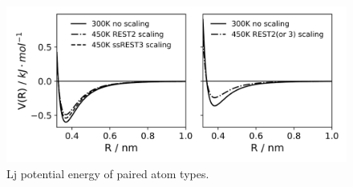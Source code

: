 \begin{figure}
    \includegraphics{../Figure_a/fig_a.svg}  
    \caption{Lj potential energy of paired atom types.}  
\end{figure}
